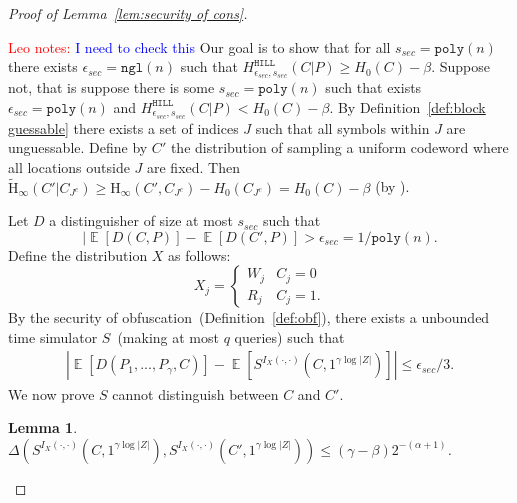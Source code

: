 \documentclass[11pt]{article}
\newtheorem{lemma}[theorem]{Lemma}
\newcommand{\defref}[1]{\mbox{Definition~\ref{#1}}}
\newcommand{\lemref}[1]{\mbox{Lemma~\ref{#1}}}
\DeclareMathOperator*{\expe}{\mathbb{E}}
\newcommand{\hill}{\ensuremath{\mathtt{HILL}}\xspace}
\newcommand{\poly}{\ensuremath{\mathtt{poly}}\xspace}
\newcommand{\ngl}{\ensuremath{\mathtt{ngl}}\xspace}
\newcommand{\Hoo}{\mathrm{H}_\infty}
\newcommand{\Hav}{\tilde{\mathrm{H}}_\infty}
\newcommand{\authnote}[2]{{\textcolor{red}{\textsf{#1 notes: }\textcolor{blue}{ #2}}\marginpar{\textcolor{red}{\textbf{!!!!!}}}}}
\newcommand{\authnote}[2]{}
\newcommand{\lnote}[1]{{\authnote{Leo}{#1}}}
\begin{document}
\begin{proof}[Proof of \lemref{lem:security of cons}]
\label{app:security of main cons}

\lnote{I need to check this}
 Our goal is to show that for all $s_{sec} = \poly(n)$ there exists $\epsilon_{sec} =\ngl(n)$ such that $H^{\hill}_{\epsilon_{sec}, s_{sec}}(C|P)\geq H_0(C)- \beta$. %
Suppose not, that is suppose there is some $s_{sec} = \poly(n)$ such that exists $\epsilon_{sec} = \poly(n)$ and $H^{\hill}_{\epsilon_{sec}, s_{sec}}(C|P) < H_0(C)-\beta$.
By \defref{def:block guessable} there exists a set of indices $J$ such that all symbols within $J$ are unguessable.  Define by $C'$ the distribution of sampling a uniform codeword where all locations outside $J$ are fixed.  Then
$\Hav(C' | C_{J^c}) \ge \Hoo(C', C_{J^c}) - H_0(C_{J^c})  = H_0(C) - \beta$ (by \cite[Lemma 2.2b]{DBLP:journals/siamcomp/DodisORS08}).

Let $D$ a distinguisher of size at most $s_{sec}$ such that
\[
| \expe[D(C, P)] - \expe[D(C', P)] > \epsilon_{sec} = 1/\poly(n).
\]
Define the distribution $X$ as follows:
\[X_j =
\begin{cases}
W_j & C_j = 0\\
R_j & C_j = 1.
\end{cases}\]  By the security of obfuscation~(\defref{def:obf}), there exists a unbounded time simulator $S$~(making at most $q$ queries) such that
\begin{align}
\label{eq:dist before marginals}
|\expe [D(P_1,..., P_\gamma, C)] - \expe [S^{I_X(\cdot, \cdot)}(C, 1^{\gamma \log |Z|})] |\leq \epsilon_{sec}/3.
\end{align}
We now prove $S$ cannot distinguish between $C$ and $C'$.
\begin{lemma}
\label{lem:sim cannot distinguish}
$\Delta(S^{I_X(\cdot, \cdot)}(C, 1^{\gamma \log |Z|}), S^{I_X(\cdot, \cdot)}(C', 1^{\gamma \log |Z|})) \le (\gamma-\beta) 2^{-(\alpha+1)}$.
\end{lemma}


\end{proof}
\end{document}
